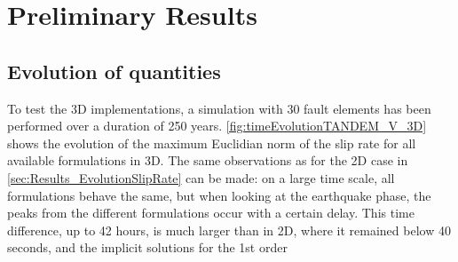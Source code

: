\section{Preliminary Results}
\subsection{Evolution of quantities}

To test the 3D implementations, a simulation with 30 fault elements has been performed over a duration of 250 years. \autoref{fig:timeEvolutionTANDEM_V_3D} shows the evolution of the maximum Euclidian norm of the slip rate for all available formulations in 3D. The same observations as for the 2D case in \autoref{sec:Results_EvolutionSlipRate} can be made: on a large time scale, all formulations behave the same, but when looking at the earthquake phase, the peaks from the different formulations occur with a certain delay. This time difference, up to 42 hours, is much larger than in 2D, where it \hfill remained \hfill below \hfill 40 \hfill seconds, \hfill and \hfill the \hfill implicit \hfill solutions \hfill for \hfill the \hfill 1st \hfill order 

